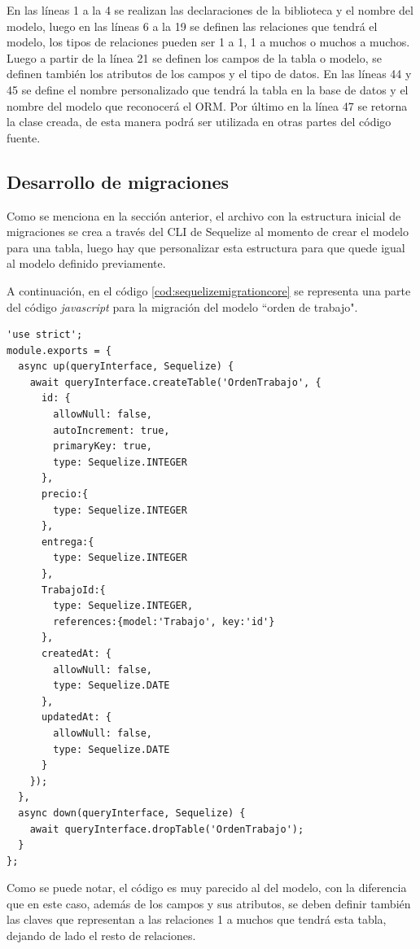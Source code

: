 En las líneas 1 a la 4 se realizan las declaraciones de la biblioteca y el nombre del modelo, 
luego en las líneas 6 a la 19 se definen las relaciones que tendrá el modelo, los tipos de relaciones pueden ser 1 a 1, 1 a muchos o muchos a muchos. Luego a partir de la línea 21 se definen los campos de la tabla o modelo, se definen también los atributos de los campos y el tipo de datos. En las líneas 44 y 45 se define el nombre personalizado que tendrá la tabla en la base de datos y el nombre del modelo que reconocerá el ORM. Por último en la línea 47 se retorna la clase creada, de esta manera podrá ser utilizada en otras partes del código fuente.


\subsection{Desarrollo de migraciones}
\label{subsec:migracionesbasededatos}

Como se menciona en la sección anterior, el archivo con la estructura inicial de migraciones se crea a través del CLI de Sequelize al momento de crear el modelo para una tabla, luego hay que personalizar esta estructura para que quede igual al modelo definido previamente. 

A continuación, en el código \ref{cod:sequelizemigrationcore} se representa una parte del código \textit{javascript} para la migración del modelo ``orden de trabajo".

\begin{lstlisting}[label=cod:sequelizemigrationcore, caption= Código para migración en Sequelize.]
'use strict';
module.exports = {
  async up(queryInterface, Sequelize) {
    await queryInterface.createTable('OrdenTrabajo', {
      id: {
        allowNull: false,
        autoIncrement: true,
        primaryKey: true,
        type: Sequelize.INTEGER
      },
      precio:{
        type: Sequelize.INTEGER
      },
      entrega:{
        type: Sequelize.INTEGER
      },
      TrabajoId:{
        type: Sequelize.INTEGER,
        references:{model:'Trabajo', key:'id'}
      },
      createdAt: {
        allowNull: false,
        type: Sequelize.DATE
      },
      updatedAt: {
        allowNull: false,
        type: Sequelize.DATE
      }
    });
  },
  async down(queryInterface, Sequelize) {
    await queryInterface.dropTable('OrdenTrabajo');
  }
};
\end{lstlisting}

Como se puede notar, el código es muy parecido al del modelo, con la diferencia que en este caso, además de los campos y sus atributos, se deben definir también las claves que representan a las relaciones 1 a muchos que tendrá esta tabla, dejando de lado el resto de relaciones. 

